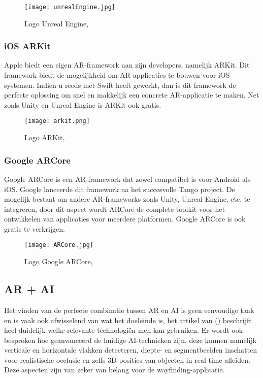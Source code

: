 \begin{figure}[H]
	\centering
	\texttt{[image: unrealEngine.jpg]}
	\caption{Logo Unreal Engine, \autocite{UnrealEngine2019}}
\end{figure}

\subsubsection{iOS ARKit}
Apple biedt een eigen AR-framework aan zijn developers, namelijk ARKit. Dit framework biedt de mogelijkheid om AR-applicaties te bouwen voor iOS-systemen. Indien u reeds met Swift heeft gewerkt, dan is dit framework de perfecte oplossing om snel en makkelijk een concrete AR-applicatie te maken. Net zoals Unity en Unreal Engine is ARKit ook gratis.
\begin{figure}[H]
	\centering
	\texttt{[image: arkit.png]}
	\caption{Logo ARKit, \autocite{Apple2019}}
\end{figure}

\subsubsection{Google ARCore}
Google ARCore is een AR-framework dat zowel compatibel is voor Android als iOS. Google lanceerde dit framework na het succesvolle Tango project.
De mogelijk bestaat om andere AR-frameworks zoals Unity, Unreal Engine, etc.  te integreren, door dit aspect wordt ARCore de complete toolkit voor het ontwikkelen van applicaties voor meerdere platformen. Google ARCore is ook gratis te verkrijgen.

\begin{figure}[H]
	\centering
	\texttt{[image: ARCore.jpg]}
	\caption{Logo Google ARCore, \autocite{ARCore2019}}
\end{figure}

\subsection{AR + AI}
Het vinden van de perfecte combinatie tussen AR en AI is geen eenvoudige taak en is vaak ook afwisselend van wat het doeleinde is, het artikel van \textcite{Toole2019} () beschrijft heel duidelijk welke relevante technologiën men kan gebruiken. Er wordt ook besproken hoe geanvanceerd de huidige AI-technieken zijn, deze kunnen namelijk  verticale en horizontale vlakken detecteren, diepte- en segmentbeelden inschatten voor realistische occlusie en zelfs 3D-posities van objecten in real-time afleiden. Deze aspecten zijn van zeker van belang voor de wayfinding-applicatie.

